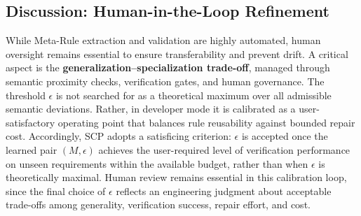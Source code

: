 \documentclass[conference]{IEEEtran}
\begin{document}
\subsection{Discussion: Human-in-the-Loop Refinement}
While Meta-Rule extraction and validation are highly automated, human oversight remains essential to ensure transferability and prevent drift. A critical aspect is the \textbf{generalization--specialization trade-off}, managed through semantic proximity checks, verification gates, and human governance.
The threshold $\epsilon$ is not searched for as a theoretical maximum over all admissible semantic deviations. Rather, in developer mode it is calibrated as a user-satisfactory operating point that balances rule reusability against bounded repair cost. %
Accordingly, SCP adopts a satisficing criterion: $\epsilon$ is accepted once the learned pair $(M,\epsilon)$ achieves the user-required level of verification performance on unseen requirements within the available budget, rather than when $\epsilon$ is theoretically maximal. Human review remains essential in this calibration loop, since the final choice of $\epsilon$ reflects an engineering judgment about acceptable trade-offs among generality, verification success, repair effort, and cost.


\end{document}
